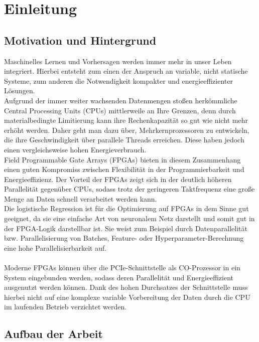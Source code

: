 \chapter{Einleitung}
\section{Motivation und Hintergrund}
Maschinelles Lernen und Vorhersagen werden immer mehr in unser Leben integriert. Hierbei entsteht zum einen der Anspruch an variable, nicht statische Systeme, zum anderen die Notwendigkeit kompakter und energieeffizienter Lösungen.\\
Aufgrund der immer weiter wachsenden Datenmengen stoßen herkömmliche Central Processing Units (CPUs) mittlerweile an Ihre Grenzen, denn durch materialbedingte Limitierung kann ihre Rechenkapazität so gut wie nicht mehr erhöht werden. Daher geht man dazu über, Mehrkernprozessoren zu entwickeln, die ihre Geschwindigkeit über parallele Threads erreichen. Diese haben jedoch einen vergleichsweise hohen Energieverbrauch.\\
Field Programmable Gate Arrays (FPGAs) bieten in diesem Zusammenhang einen guten Kompromiss zwischen Flexibilität in der Programmierbarkeit und Energieeffizienz. Der Vorteil der FPGAs zeigt sich in der deutlich höheren Parallelität gegenüber CPUs, sodass trotz der geringeren Taktfrequenz eine große Menge an Daten schnell verarbeitet werden kann.\\
Die logistische Regression ist für die Optimierung auf FPGAs in dem Sinne gut geeignet, da sie eine einfache Art von neuronalem Netz darstellt und somit gut in der FPGA-Logik darstellbar ist. Sie weist zum Beispiel durch Datenparallelität bzw. Parallelisierung von Batches, Feature- oder Hyperparameter-Berechnung eine hohe Parallelisierbarkeit auf.\\\\
Moderne FPGAs können über die PCIe-Schnittstelle als CO-Prozessor in ein System eingebunden werden, sodass deren Parallelität und Energieeffizient ausgenutzt werden können. Dank des hohen Durchsatzes der Schnittstelle muss hierbei nicht auf eine komplexe variable Vorbereitung der Daten durch die CPU im laufenden Betrieb verzichtet werden.

\section{Aufbau der Arbeit}